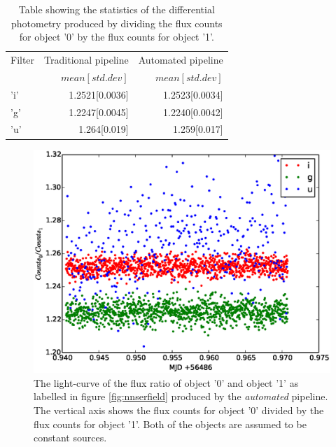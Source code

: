 \begin{table}[ht]
  \label{tab:differential}
  \caption{Table showing the statistics of the differential photometry produced by dividing the flux counts for object '0' by the flux counts for object '1'.}
  \centering
  \begin{tabular}{|l|r|r|}
    \hline
    Filter & Traditional pipeline & Automated pipeline  \\
           &  $mean[std. dev]$    & $mean[std. dev]$ \\
    \hline
    'i'    & 1.2521[0.0036]       & 1.2523[0.0034] \\
    'g'    & 1.2247[0.0045]       & 1.2240[0.0042]\\
    'u'    & 1.264[0.019]         & 1.259[0.017] \\
    \hline
   \end{tabular}
\end{table}

\begin{figure}[!h]
\centering
\includegraphics[width=140mm]{images/differential_auto.eps}
\caption{The light-curve of the flux ratio of object '0' and object '1' as labelled in figure \ref{fig:nnserfield} produced by the \emph{automated} pipeline. The vertical axis shows the flux counts for object '0' divided by the flux counts for object '1'. Both of the objects are assumed to be constant sources. }
\label{fig:differentialauto}
\end{figure}

